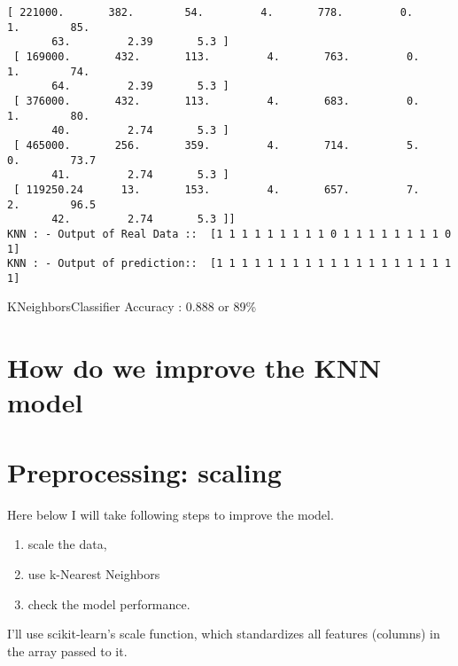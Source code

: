 \documentclass[11pt]{article}
\begin{document}
\begin{Verbatim}[commandchars=\\\{\}]
 [ 221000.       382.        54.         4.       778.         0.         1.        85.
       63.         2.39       5.3 ]
 [ 169000.       432.       113.         4.       763.         0.         1.        74.
       64.         2.39       5.3 ]
 [ 376000.       432.       113.         4.       683.         0.         1.        80.
       40.         2.74       5.3 ]
 [ 465000.       256.       359.         4.       714.         5.         0.        73.7
       41.         2.74       5.3 ]
 [ 119250.24      13.       153.         4.       657.         7.         2.        96.5
       42.         2.74       5.3 ]]
KNN : - Output of Real Data ::  [1 1 1 1 1 1 1 1 1 0 1 1 1 1 1 1 1 1 0 1]
KNN : - Output of prediction::  [1 1 1 1 1 1 1 1 1 1 1 1 1 1 1 1 1 1 1 1]

    \end{Verbatim}

    KNeighborsClassifier Accuracy : 0.888 or 89\%

    \section{How do we improve the KNN
model}\label{how-do-we-improve-the-knn-model}

\section{Preprocessing: scaling}\label{preprocessing-scaling}

Here below I will take following steps to improve the model.

\begin{enumerate}
\def\labelenumi{(\roman{enumi})}
\item
  scale the data,
\item
  use k-Nearest Neighbors
\item
  check the model performance.
\end{enumerate}

I'll use scikit-learn's scale function, which standardizes all features
(columns) in the array passed to it.
\end{document}
